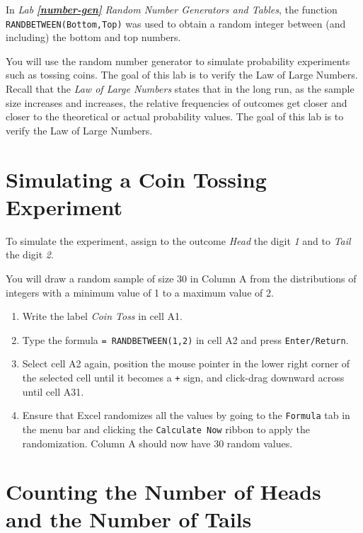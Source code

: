 \documentclass[
]{book}
\providecommand{\tightlist}{%
  \setlength{\itemsep}{0pt}\setlength{\parskip}{0pt}}
\begin{document}
In \emph{Lab} \textbf{\emph{\ref{number-gen}}} \emph{Random Number Generators and Tables}, the function \texttt{RANDBETWEEN(Bottom,Top)} was used to obtain a random integer between (and including) the bottom and top numbers.

You will use the random number generator to simulate probability experiments such as tossing coins. The goal of this lab is to verify the Law of Large Numbers. Recall that the \emph{Law of Large Numbers} states that in the long run, as the sample size increases and increases, the relative frequencies of outcomes get closer and closer to the theoretical or actual probability values. The goal of this lab is to verify the Law of Large Numbers.

\hypertarget{simulating-a-coin-tossing-experiment}{%
\section{Simulating a Coin Tossing Experiment}\label{simulating-a-coin-tossing-experiment}}

To simulate the experiment, assign to the outcome \emph{Head} the digit \emph{1} and to \emph{Tail} the digit \emph{2}.

You will draw a random sample of size 30 in Column A from the distributions of integers with a minimum value of 1 to a maximum value of 2.

\begin{enumerate}
\def\labelenumi{\arabic{enumi}.}
\tightlist
\item
  Write the label \emph{Coin Toss} in cell A1.
\item
  Type the formula \texttt{=\ RANDBETWEEN(1,2)} in cell A2 and press \texttt{Enter/Return}.
\item
  Select cell A2 again, position the mouse pointer in the lower right corner of the selected cell until it becomes a \texttt{+} sign, and click-drag downward across until cell A31.
\item
  Ensure that Excel randomizes all the values by going to the \texttt{Formula} tab in the menu bar and clicking the \texttt{Calculate\ Now} ribbon to apply the randomization. Column A should now have 30 random values.
\end{enumerate}

\hypertarget{counting-the-number-of-heads-and-the-number-of-tails}{%
\section{Counting the Number of Heads and the Number of Tails}\label{counting-the-number-of-heads-and-the-number-of-tails}}
\end{document}
